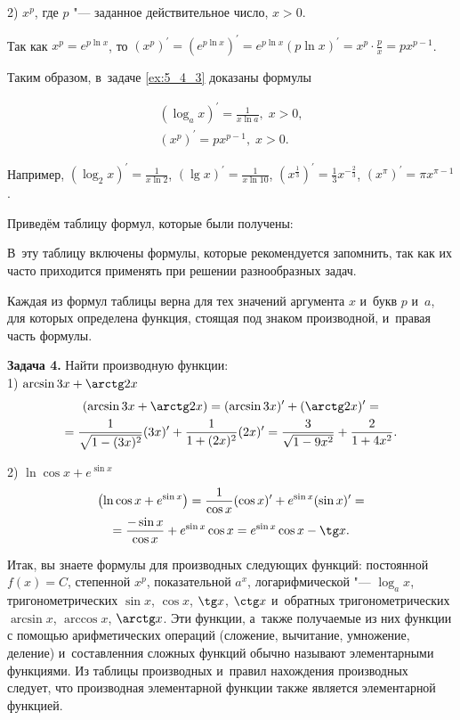 2) $x^{p}$, где $p$ "--- заданное действительное число, $x > 0$.

Так как $x^{p} = e^{p \ln x}$, то
$\displaystyle (x^{p})^\prime = ( e^{p \ln x} )^\prime = 
e^{p \ln x} ( p \ln x )^\prime = x^{p} \cdot \frac{p}{x} = px^{p-1}$.

Таким образом, в~задаче \ref{ex:5_4_3} доказаны формулы

\begin{gather}
\displaystyle ( \log_{a} x )^\prime = \frac{1}{x \ln a}, \; x > 0, \label{eq:5_4_7} \\
( x^{p} )^\prime = px^{p-1}, \; x > 0. \label{eq:5_4_8}
\end{gather}

\noindent
Например, $\displaystyle( \log_{2} x)^\prime = \frac{1}{x \ln 2}$, 
$\displaystyle ( \lg x )^\prime = \frac{1}{x \ln 10}$,
$\displaystyle \left( x^{\frac{1}{3}} \right)^\prime = \frac{1}{3} x^{-\frac{2}{3}}$,
$( x^{\pi} )^\prime = \pi x^{\pi -1}$.

Приведём таблицу формул, которые были получены:


В~эту таблицу включены формулы, которые рекомендуется запомнить,
так как их часто приходится применять при решении разнообразных задач.

Каждая из формул таблицы верна для тех значений аргумента $x$ и~букв $p$ и~$a$,
для которых определена функция, стоящая под знаком производной,
и~правая часть формулы.

\textbf{Задача 4.}\label{ex:5_4_4} Найти производную функции:\\

1) $\arcsin 3x + \arctg 2x$
\begin{multline*}
\displaystyle (\arcsin 3x + \arctg 2x) = (\arcsin 3x)^\prime + (\arctg 2x)^\prime = \\
= \frac{1}{\sqrt{1 - (3x)^{2}}}(3x)^\prime + \frac{1}{1 + (2x)^{2}}(2x)^\prime = 
\frac{3}{\sqrt{1 - 9x^{2}}} + \frac{2}{1 + 4x^{2}}.
\end{multline*}

2) $\ln \cos x + e^{\sin x}$
\begin{multline*}
\displaystyle \left( \ln \cos x + e^{\sin x} \right) =
\frac{1}{\cos x} (\cos x)^\prime + e^{\sin x} (\sin x)^\prime = \\
= \frac{-\sin x}{\cos x} + e^{\sin x} \cos x = e^{\sin x} \cos x - \tg x.
\end{multline*}

Итак, вы знаете формулы для производных следующих функций:
постоянной $f(x) = C$, степенной $x^{p}$, показательной $a^{x}$,
логарифмической "--- $\log_{a} x$,
тригонометрических $\sin x$, $\cos x$, $\tg x$, $\ctg x$
и~обратных тригонометрических $\arcsin x$, $\arccos x$, $\arctg x$.
Эти функции, а~также получаемые из них функции с помощью арифметических операций
(сложение, вычитание, умножение, деление) и~составленния сложных функций обычно
называют элементарными функциями. Из таблицы производных и~правил нахождения
производных следует, что производная элементарной функции
также является элементарной функцией.
